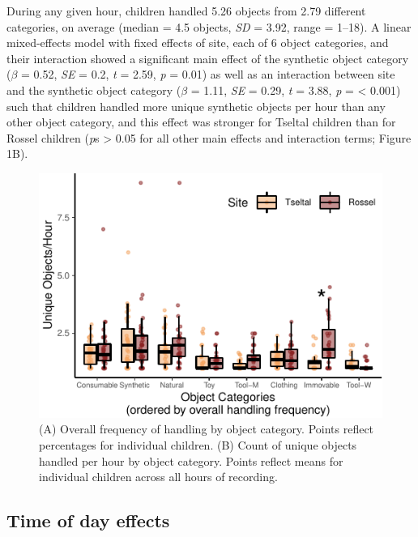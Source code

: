 \documentclass[10pt, letterpaper]{article}
\newenvironment{CodeChunk}{}{}
\begin{document}
During any given hour, children handled 5.26 objects from 2.79 different
categories, on average (median = 4.5 objects, \emph{SD} = 3.92, range =
1--18). A linear mixed-effects model with fixed effects of site, each of
6 object categories, and their interaction showed a significant main
effect of the synthetic object category (\(\beta\) = 0.52, \emph{SE} =
0.2, \emph{t} = 2.59, \emph{p} = 0.01) as well as an interaction between
site and the synthetic object category (\(\beta\) = 1.11, \emph{SE} =
0.29, \emph{t} = 3.88, \emph{p} = \textless{} 0.001) such that children
handled more unique synthetic objects per hour than any other object
category, and this effect was stronger for Tseltal children than for
Rossel children (\emph{p}s \textgreater{} 0.05 for all other main
effects and interaction terms; Figure 1B).

\begin{CodeChunk}
\begin{figure}[!ht]

{\centering \includegraphics{figs/overall-stats-fig-1} 

}

\caption[(A) Overall frequency of handling by object category]{(A) Overall frequency of handling by object category. Points reflect percentages for individual children. (B) Count of unique objects handled per hour by object category. Points reflect means for individual children across all hours of recording.}\label{fig:overall-stats-fig}
\end{figure}
\end{CodeChunk}

\hypertarget{time-of-day-effects}{%
\subsection{Time of day effects}\label{time-of-day-effects}}
\end{document}
